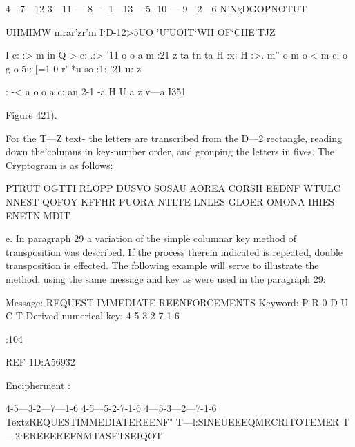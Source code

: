 {4—7—12-3—11 — 8—- 1—13— 5- 10 — 9—2—6
N'NgDGOPNOTUT

 

 

 

 

 

 

 

UHMIMW
mrar'zr'm
I‘D-12>5UO
'U'UOIT‘WH
OF‘CHE'TJZ

 

I c: :> m in Q > c: .:>
'11 o o a m :21 z
ta tn ta H :x: H :>.
m” o m o < m c:
o g o 5:: [=1 0 r'
*u so :1: '21 u: z}: -<
a o o a c: an 2-1
-a H U a z v—a I351

 

 

 

 

 

 

 

 

 

 

 

 

 

 

 

Figure 421).

For the T—Z text- the letters are transcribed from the D—2 rectangle,
reading down the'columns in key-number order, and grouping the letters
in ﬁves. The Cryptogram is as follows:

PTRUT OGTTI RLOPP DUSVO SOSAU AOREA
CORSH EEDNF WTULC NNEST QOFOY KFFHR
PUORA NTLTE LNLES GLOER OMONA IHIES
ENETN MDIT

e. In paragraph 29 a variation of the simple columnar key method
of transposition was described. If the process therein indicated is
repeated, double transposition is effected. The following example will
serve to illustrate the method, using the same message and key as were
used in the paragraph 29:

Message: REQUEST IMMEDIATE REENFORCEMENTS
Keyword: P R 0 D U C T
Derived numerical key: 4-5-3-2-7-1-6

:104

 

 

REF 1D:A56932

Encipherment :

4-5—3-2—7—1-6 4-5—5-2-7-1-6 4—5-3—2—7-1-6
TextzREQUESTIMMEDIATEREENF"
T—l:SINEUEEEQMRCRITOTEMER
T—2:EREEEREFNMTASETSEIQOT


